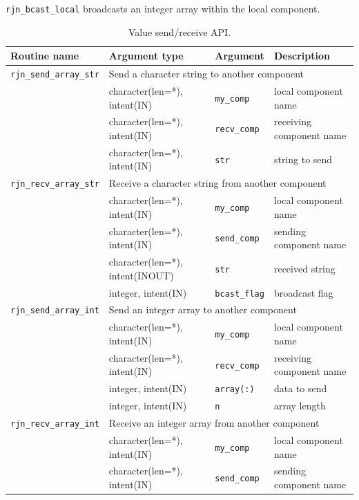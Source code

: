 \documentclass[11pt,a4paper]{report}
\begin{document}
\texttt{rjn\_bcast\_local} broadcasts
an integer array within the local component.

\begin{table}[H]
\begin{center}
\caption{Value send/receive API.}
{\small
\label{table:rjn_api_sendrecv}
\begin{tabular}{llll}
\hline\hline
Routine name & Argument type & Argument & Description \\
\hline
 \texttt{rjn\_send\_array\_str} &  \multicolumn{3}{l}{Send a character string to another component}\\
           &  character(len=*), intent(IN) & \texttt{my\_comp}  & local component name\\
           &  character(len=*), intent(IN) & \texttt{recv\_comp}  & receiving component name\\
           & character(len=*), intent(IN) & \texttt{str} & string to send\\
\hline
 \texttt{rjn\_recv\_array\_str} &  \multicolumn{3}{l}{Receive a character string from another component}\\
           &  character(len=*), intent(IN) & \texttt{my\_comp}  & local component name\\
           &  character(len=*), intent(IN) & \texttt{send\_comp}  & sending component name\\
           & character(len=*), intent(INOUT) & \texttt{str} & received string\\
           & integer, intent(IN) & \texttt{bcast\_flag} & broadcast flag\\
\hline
 \texttt{rjn\_send\_array\_int} &  \multicolumn{3}{l}{Send an integer array to another component}\\
           &  character(len=*), intent(IN) & \texttt{my\_comp}  & local component name\\
           &  character(len=*), intent(IN) & \texttt{recv\_comp}  & receiving component name\\
           & integer, intent(IN) & \texttt{array(:)} & data to send\\
           & integer, intent(IN) & \texttt{n} & array length\\
\hline
 \texttt{rjn\_recv\_array\_int} &  \multicolumn{3}{l}{Receive an integer array from another component}\\
           &  character(len=*), intent(IN) & \texttt{my\_comp}  & local component name\\
           &  character(len=*), intent(IN) & \texttt{send\_comp}  & sending component name\\

\end{tabular}}
\end{center}
\end{table}
\end{document}
